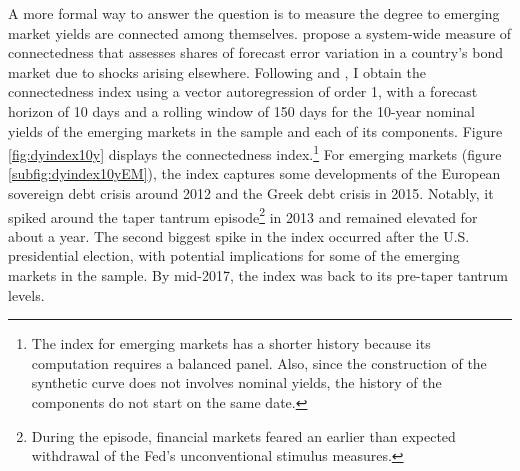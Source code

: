 {A more formal way to answer the question is to measure the degree to emerging market yields are connected among themselves.
\cite{DieboldYilmaz:2014} propose a system-wide measure of connectedness 
that assesses shares of forecast error variation in a country's bond market due to shocks arising elsewhere.
Following \cite{ACDM:2019} and \cite{BostanciYilmaz:2020}, I obtain the connectedness index using a vector autoregression of order 1, with a forecast horizon of 10 days and a rolling window of 150 days for the 10-year nominal yields of the emerging markets in the sample and each of its components.
Figure \ref{fig:dyindex10y} displays the connectedness index.\footnote{ The index for emerging markets has a shorter history because its computation requires a balanced panel. Also, since the construction of the synthetic curve does not involves nominal yields, the history of the components do not start on the same date.} 
For emerging markets (figure \ref{subfig:dyindex10yEM}), the index captures some developments of the European sovereign debt crisis around 2012 and  the Greek debt crisis in 2015.
Notably, it spiked around the taper tantrum episode\footnote{ During the episode, financial markets feared an earlier than expected withdrawal of the Fed's unconventional stimulus measures.} in 2013 and remained elevated for about a year.
The second biggest spike in the index occurred after the U.S. presidential election, with potential implications for some of the emerging markets in the sample.
By mid-2017, the index was back to its pre-taper tantrum levels.

}
